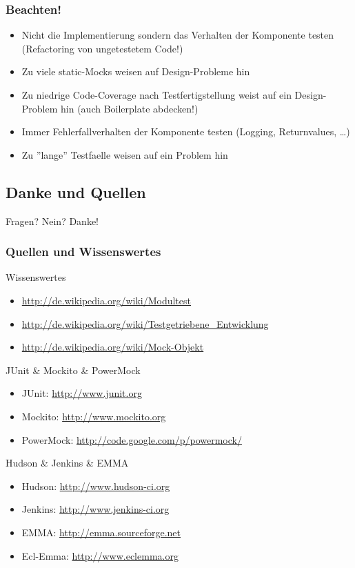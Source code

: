 \documentclass{beamer}
\begin{document}
			\begin{frame}
				\frametitle{Beachten!}

				\begin{itemize}
					\item{Nicht die Implementierung sondern das Verhalten der Komponente testen (Refactoring von ungetestetem Code!)}
					\pause
					\item{Zu viele static-Mocks weisen auf Design-Probleme hin}
					\pause
					\item{Zu niedrige Code-Coverage nach Testfertigstellung weist auf ein Design-Problem hin (auch Boilerplate abdecken!)}
					\pause
					\item{Immer Fehlerfallverhalten der Komponente testen (Logging, Returnvalues, \ldots)}
					\pause
					\item{Zu ''lange'' Testfaelle weisen auf ein Problem hin}
				\end{itemize}
			\end{frame}

		
		\subsection{Danke und Quellen}

			\begin{frame}
				Fragen? Nein? Danke!
			\end{frame}

			\begin{frame}
				\frametitle{Quellen und Wissenswertes}

				\scriptsize
				Wissenswertes
				\begin{itemize}
					\item{\url{http://de.wikipedia.org/wiki/Modultest}}
					\item{\url{http://de.wikipedia.org/wiki/Testgetriebene\_Entwicklung}}
					\item{\url{http://de.wikipedia.org/wiki/Mock-Objekt}}
				\end{itemize}

				JUnit \& Mockito \& PowerMock 
				\begin{itemize}
					\item{JUnit: \url{http://www.junit.org}}
					\item{Mockito: \url{http://www.mockito.org}}
					\item{PowerMock: \url{http://code.google.com/p/powermock/}}
				\end{itemize}

				Hudson \& Jenkins \& EMMA
				\begin{itemize}
					\item{Hudson: \url{http://www.hudson-ci.org}}
					\item{Jenkins: \url{http://www.jenkins-ci.org}}
					\item{EMMA: \url{http://emma.sourceforge.net}}
					\item{Ecl-Emma: \url{http://www.eclemma.org}}
				\end{itemize}
			\end{frame}
\end{document}
